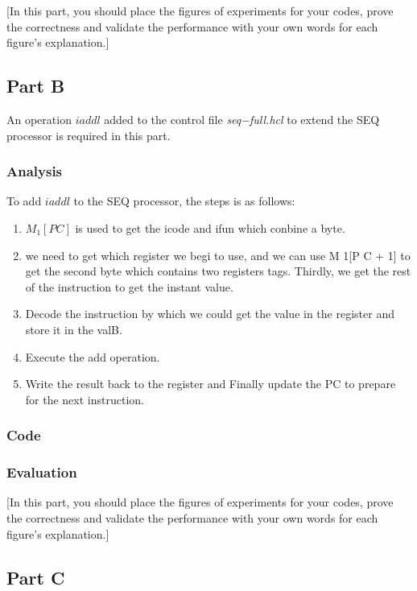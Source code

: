 \documentclass{article}
\begin{document}
[In this part, you should place the figures of experiments for your codes, prove the correctness and validate the performance with your own words for each figure’s explanation.]\

\subsection{Part B}
An operation $iaddl$ added to the control file \textit{seq−full.hcl} to extend the SEQ processor is required in this part.
\subsubsection{Analysis}
To add $iaddl$ to the SEQ processor, the steps is as follows:

\begin{enumerate}
\item $M_1[PC]$ is used to get the icode and ifun which conbine a byte.
\item  we need to get which register we begi to use, and we can use M 1[P C + 1] to get the second byte which contains two registers tags.
Thirdly, we get the rest of the instruction to get the instant value. 
\item Decode the instruction by which we could get the value in the register and store it in the valB.
\item Execute the add operation.
\item Write the result back to the register and Finally update the PC to prepare for the next instruction.
\end{enumerate}


\subsubsection{Code}



\subsubsection{Evaluation}

[In this part, you should place the figures of experiments for your codes, prove the correctness and validate the performance with your own words for each figure’s explanation.]

\subsection{Part C}
\end{document}
